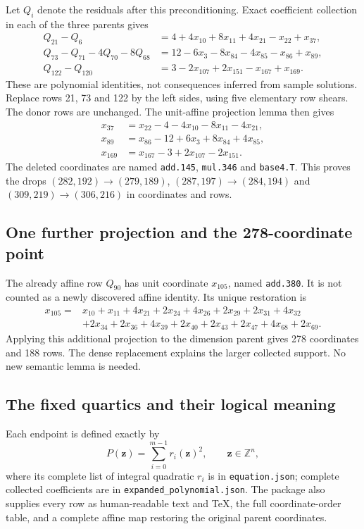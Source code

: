 Let $Q_i$ denote the residuals after this preconditioning.  Exact
coefficient collection in each of the three parents gives
\[
\begin{aligned}
Q_{21}-Q_6
 &=4+4x_{10}+8x_{11}+4x_{21}-x_{22}+x_{37},\\
Q_{73}-Q_{71}-4Q_{70}-8Q_{68}
 &=12-6x_3-8x_{84}-4x_{85}-x_{86}+x_{89},\\
Q_{122}-Q_{120}
 &=3-2x_{107}+2x_{151}-x_{167}+x_{169}.
\end{aligned}
\]
These are polynomial identities, not consequences inferred from sample
solutions.  Replace rows 21, 73 and 122 by the left sides, using five
elementary row shears.  The donor rows are unchanged.  The unit-affine
projection lemma then gives
\[
\begin{aligned}
x_{37}&=x_{22}-4-4x_{10}-8x_{11}-4x_{21},\\
x_{89}&=x_{86}-12+6x_3+8x_{84}+4x_{85},\\
x_{169}&=x_{167}-3+2x_{107}-2x_{151}.
\end{aligned}
\]
The deleted coordinates are named \texttt{add.145}, \texttt{mul.346}
and \texttt{base4.T}.  This proves the drops
$(282,192)\to(279,189)$, $(287,197)\to(284,194)$ and
$(309,219)\to(306,216)$ in coordinates and rows.

\subsection{One further projection and the 278-coordinate point}

The already affine row $Q_{90}$ has unit coordinate $x_{105}$,
named \texttt{add.380}.  It is not counted as a newly discovered affine
identity.  Its unique restoration is
\[
\begin{aligned}
x_{105}={}&x_{10}+x_{11}+4x_{21}+2x_{24}+4x_{26}+2x_{29}
            +2x_{31}+4x_{32}\\
          &+2x_{34}+2x_{36}+4x_{39}+2x_{40}+2x_{43}
            +2x_{47}+4x_{68}+2x_{69}.
\end{aligned}
\]
Applying this additional projection to the dimension parent gives 278
coordinates and 188 rows.  The dense replacement explains the larger
collected support.  No new semantic lemma is needed.

\subsection{The fixed quartics and their logical meaning}

Each endpoint is defined exactly by
\[
 P(\mathbf z)=\sum_{i=0}^{m-1}r_i(\mathbf z)^2,
 \qquad \mathbf z\in\mathbb Z^n,
\]
where its complete list of integral quadratic $r_i$ is in
\texttt{equation.json}; complete collected coefficients are in
\texttt{expanded\_polynomial.json}.  The package also supplies every row
as human-readable text and TeX, the full coordinate-order table, and a
complete affine map restoring the original parent coordinates.

